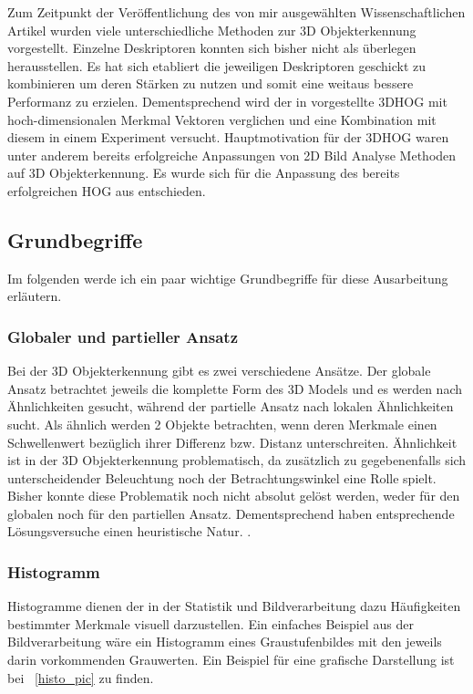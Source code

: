 Zum Zeitpunkt der Veröffentlichung des von mir ausgewählten Wissenschaftlichen Artikel wurden viele
unterschiedliche Methoden zur 3D Objekterkennung vorgestellt. Einzelne Deskriptoren konnten sich 
bisher nicht als überlegen herausstellen. Es hat sich etabliert die jeweiligen Deskriptoren
geschickt zu kombinieren um deren Stärken zu nutzen und somit eine weitaus bessere Performanz zu erzielen.
Dementsprechend wird der in \cite{scherer2010histograms} vorgestellte 3DHOG mit hoch-dimensionalen Merkmal Vektoren
verglichen und eine Kombination mit diesem in einem Experiment versucht.
\newline
Hauptmotivation für der 3DHOG waren unter anderem bereits erfolgreiche Anpassungen von 2D Bild Analyse Methoden auf 3D Objekterkennung. Es wurde sich für die Anpassung des bereits erfolgreichen HOG aus \cite{dalal2005histograms} entschieden.


\subsection{Grundbegriffe}
Im folgenden werde ich ein paar wichtige Grundbegriffe für diese Ausarbeitung erläutern. 

\subsubsection{Globaler und partieller Ansatz}
Bei der 3D Objekterkennung gibt es zwei verschiedene Ansätze. Der globale Ansatz betrachtet jeweils die komplette Form des
3D Models und es werden nach Ähnlichkeiten gesucht, während der partielle Ansatz nach lokalen Ähnlichkeiten sucht. Als ähnlich werden 2 Objekte betrachten, wenn deren Merkmale einen Schwellenwert bezüglich ihrer Differenz bzw. Distanz unterschreiten. Ähnlichkeit ist in der 3D Objekterkennung problematisch, da zusätzlich zu gegebenenfalls sich unterscheidender Beleuchtung noch der Betrachtungswinkel eine Rolle spielt. Bisher konnte diese Problematik noch nicht absolut gelöst werden, weder für den globalen noch für den partiellen Ansatz. Dementsprechend haben entsprechende Lösungsversuche einen heuristische Natur. \cite{scherer2010histograms}.

\subsubsection{Histogramm}
Histogramme dienen der in der Statistik und Bildverarbeitung dazu Häufigkeiten bestimmter Merkmale
visuell darzustellen. Ein einfaches Beispiel aus der Bildverarbeitung wäre ein Histogramm eines
Graustufenbildes mit den jeweils darin vorkommenden Grauwerten. Ein Beispiel für eine grafische Darstellung ist bei \figurename~\ref{histo_pic} zu finden.

